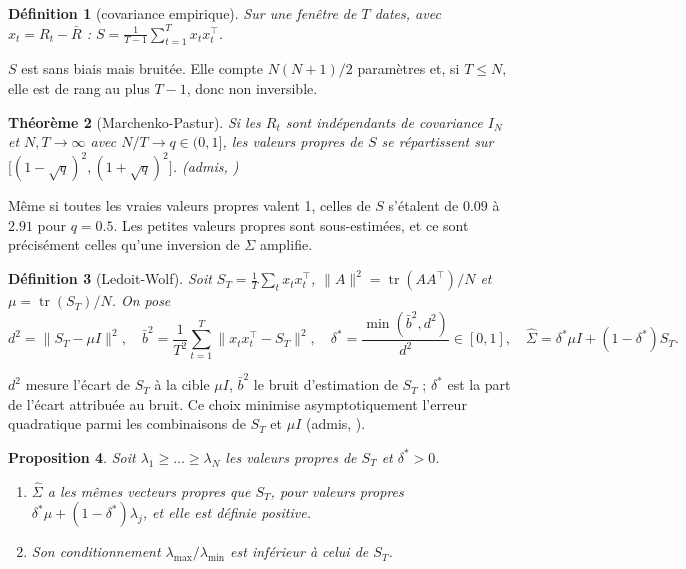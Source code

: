 \documentclass[11pt,a4paper]{article}
\theoremstyle{pdef}
\newtheorem{definition}{Définition}[section]
\theoremstyle{pstate}
\newtheorem{proposition}[definition]{Proposition}
\newtheorem{theoreme}[definition]{Théorème}
\newcommand{\admis}[1]{{\upshape\small\color{ink2}(admis, #1)}}
\newcommand{\T}{^{\top}}
\DeclareMathOperator{\tr}{tr}
\begin{document}
\begin{definition}[covariance empirique]
Sur une fenêtre de $T$ dates, avec $x_t=R_t-\bar R$ : $S=\frac{1}{T-1}\sum_{t=1}^Tx_tx_t\T$.
\end{definition}

$S$ est sans biais mais bruitée. Elle compte $N(N+1)/2$ paramètres et, si $T\le N$, elle
est de rang au plus $T-1$, donc non inversible.

\begin{theoreme}[Marchenko-Pastur]\label{thm:mp}
Si les $R_t$ sont indépendants de covariance $I_N$ et $N,T\to\infty$ avec $N/T\to q\in(0,1]$,
les valeurs propres de $S$ se répartissent sur $\bigl[(1-\sqrt q)^2,(1+\sqrt q)^2\bigr]$.
\admis{\citealp{marchenko1967}}
\end{theoreme}

Même si toutes les vraies valeurs propres valent 1, celles de $S$ s'étalent de $0.09$ à
$2.91$ pour $q=0.5$. Les petites valeurs propres sont sous-estimées, et ce sont
précisément celles qu'une inversion de $\Sigma$ amplifie.

\begin{definition}[Ledoit-Wolf]
Soit $S_T=\frac1T\sum_tx_tx_t\T$, $\lVert A\rVert^2=\tr(AA\T)/N$ et $\mu=\tr(S_T)/N$. On
pose
\[
d^2=\lVert S_T-\mu I\rVert^2,\quad
\bar b^2=\frac1{T^2}\sum_{t=1}^T\lVert x_tx_t\T-S_T\rVert^2,\quad
\delta^\ast=\frac{\min(\bar b^2,d^2)}{d^2}\in[0,1],\quad
\hat\Sigma=\delta^\ast\mu I+(1-\delta^\ast)S_T .
\]
\end{definition}

$d^2$ mesure l'écart de $S_T$ à la cible $\mu I$, $\bar b^2$ le bruit d'estimation de
$S_T$ ; $\delta^\ast$ est la part de l'écart attribuée au bruit. Ce choix minimise
asymptotiquement l'erreur quadratique parmi les combinaisons de $S_T$ et $\mu I$
\admis{\citealp{ledoitwolf2004}}.

\begin{proposition}\label{prop:lw}
Soit $\lambda_1\ge\dots\ge\lambda_N$ les valeurs propres de $S_T$ et $\delta^\ast>0$.
\begin{enumerate}[label=(\roman*)]
\item $\hat\Sigma$ a les mêmes vecteurs propres que $S_T$, pour valeurs propres
$\delta^\ast\mu+(1-\delta^\ast)\lambda_j$, et elle est définie positive.
\item Son conditionnement $\lambda_{\max}/\lambda_{\min}$ est inférieur à celui de $S_T$.
\end{enumerate}
\end{proposition}
\end{document}
